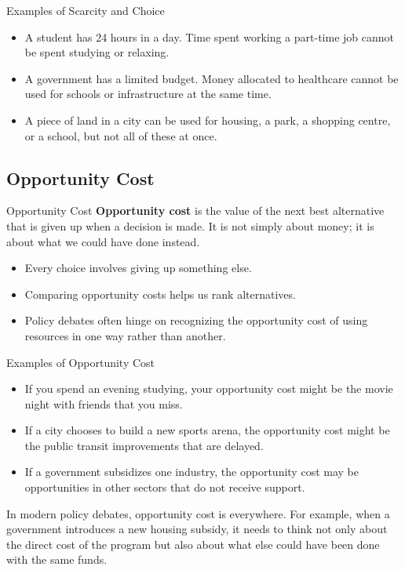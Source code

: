 \documentclass[aspectratio=169]{beamer}
\begin{document}
\begin{frame}{Examples of Scarcity and Choice}
  \transfade
  \begin{itemize}
    \item A student has 24 hours in a day. Time spent working a part-time job cannot be spent
    studying or relaxing.
    \item A government has a limited budget. Money allocated to healthcare cannot be used for
    schools or infrastructure at the same time.
    \item A piece of land in a city can be used for housing, a park, a shopping centre, or a school,
    but not all of these at once.
  \end{itemize}


\end{frame}

\subsection{Opportunity Cost}

\begin{frame}{Opportunity Cost}
  \transfade
  \textbf{Opportunity cost} is the value of the next best alternative that is given up when a decision
  is made. It is not simply about money; it is about what we could have done instead.

  \vspace{0.3cm}
  \begin{itemize}
    \item Every choice involves giving up something else.
    \item Comparing opportunity costs helps us rank alternatives.
    \item Policy debates often hinge on recognizing the opportunity cost of using resources in one
    way rather than another.
  \end{itemize}
\end{frame}

\begin{frame}{Examples of Opportunity Cost}
  \transfade
  \begin{itemize}
    \item If you spend an evening studying, your opportunity cost might be the movie night with
    friends that you miss.
    \item If a city chooses to build a new sports arena, the opportunity cost might be the public
    transit improvements that are delayed.
    \item If a government subsidizes one industry, the opportunity cost may be opportunities in
    other sectors that do not receive support.
  \end{itemize}

  \vspace{0.3cm}
  In modern policy debates, opportunity cost is everywhere. For example, when a government
  introduces a new housing subsidy, it needs to think not only about the direct cost of the
  program but also about what else could have been done with the same funds.
\end{frame}
\end{document}
